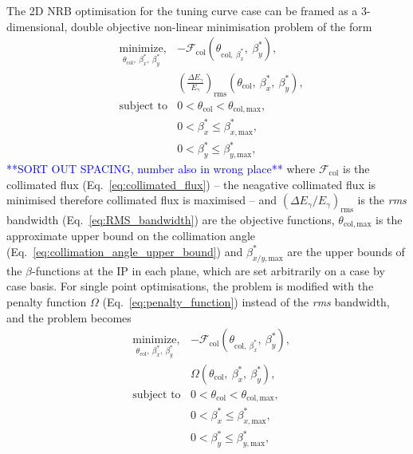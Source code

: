 \documentclass[../main.tex]{subfiles}
\begin{document}
The 2D NRB optimisation for the tuning curve case can be framed as a 3-dimensional, double objective non-linear minimisation problem of the form
\begin{equation}
\begin{aligned}
&\underset{\theta_{\mathrm{col}},~\beta_{x}^{*},~\beta_{y}^{*}}{\text{minimize}},  &-\mathcal{F}_{\mathrm{col}}\left(\theta_{\mathrm{col},~\beta_{x}^{*}},~\beta_{y}^{*}\right), \\
& &\left(\frac{\Delta E_{\gamma}}{E_{\gamma}}\right)_{\mathrm{rms}}\left(\theta_{\mathrm{col}},~\beta_{x}^{*},~\beta_{y}^{*}\right), \\
&\text{subject to} &0 < \theta_{\mathrm{col}} <  \theta_{\mathrm{col},\mathrm{max}}, \\
& &0 < \beta_{x}^{*} \leq \beta_{x,\mathrm{max}}^{*}, \\
& &0 < \beta_{y}^{*} \leq \beta_{y,\mathrm{max}}^{*}, 
\end{aligned}
\label{eq:2D_tuning_curve_optimisation_definition}
\end{equation}
\textcolor{blue}{**SORT OUT SPACING, number also in wrong place**}
where $\mathcal{F}_{\mathrm{col}}$ is the collimated flux (Eq.~\ref{eq:collimated_flux}) -- the neagative collimated flux is minimised therefore collimated flux is maximised -- and $\left(\Delta E_{\gamma}/E_{\gamma}\right)_{\mathrm{rms}}$ is the \textit{rms} bandwidth (Eq.~\ref{eq:RMS_bandwidth}) are the objective functions, $\theta_{\mathrm{col},\mathrm{max}}$ is the approximate upper bound on the collimation angle (Eq.~\ref{eq:collimation_angle_upper_bound}) and $\beta_{x/y,\mathrm{max}}^{*}$ are the upper bounds of the $\beta$-functions at the IP in each plane, which are set arbitrarily on a case by case basis. For single point optimisations, the problem is modified with the penalty function $\Omega$ (Eq.~\ref{eq:penalty_function}) instead of the \textit{rms} bandwidth, and the problem becomes
\begin{equation}
\begin{aligned}
&\underset{\theta_{\mathrm{col}},~\beta_{x}^{*},~\beta_{y}^{*}}{\text{minimize}},  &-\mathcal{F}_{\mathrm{col}}\left(\theta_{\mathrm{col},~\beta_{x}^{*}},~\beta_{y}^{*}\right), \\
& &\Omega\left(\theta_{\mathrm{col}},~\beta_{x}^{*},~\beta_{y}^{*}\right), \\
&\text{subject to} &0 < \theta_{\mathrm{col}} <  \theta_{\mathrm{col},\mathrm{max}}, \\
& &0 < \beta_{x}^{*} \leq \beta_{x,\mathrm{max}}^{*}, \\
& &0 < \beta_{y}^{*} \leq \beta_{y,\mathrm{max}}^{*}, 
\end{aligned}
\label{eq:2D_single_point_optimisation_definition}
\end{equation}
\end{document}
